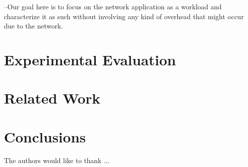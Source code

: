 \documentclass[prodmode,acmtaco]{acmsmall}
\begin{document}
--Our goal here is to focus on the network application as a workload and characterize it as such without involving any kind of overhead that might occur due to the network.\\

\section{Experimental Evaluation}

\section{Related Work}

\section{Conclusions}

\begin{acks}
The authors would like to thank ...
\end{acks}




\end{document}
